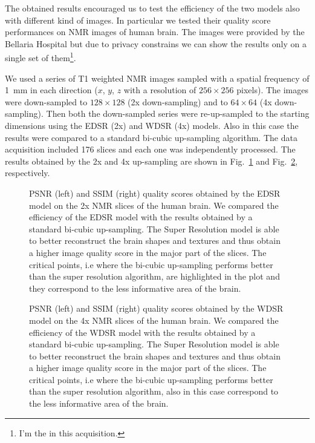\documentclass{standalone}
\begin{document}
The obtained results encouraged us to test the efficiency of the two models also with different kind of images.
In particular we tested their quality score performances on NMR images of human brain.
The images were provided by the Bellaria Hospital but due to privacy constrains we can show the results only on a single set of them\footnote{
  I'm the  in this acquisition.
}.

We used a series of T1 weighted NMR images sampled with a spatial frequency of 1~mm in each direction ($x$, $y$, $z$ with a resolution of $256\times256$ pixels).
The images were down-sampled to $128\times128$ (2x down-sampling) and to $64\times64$ (4x down-sampling).
Then both the down-sampled series were re-up-sampled to the starting dimensions using the EDSR (2x) and WDSR (4x) models.
Also in this case the results were compared to a standard bi-cubic up-sampling algorithm.
The data acquisition included 176 slices and each one was independently processed.
The results obtained by the 2x and 4x up-sampling are shown in Fig.~\ref{fig:sr_2x} and Fig.~\ref{fig:sr_4x}, respectively.

\begin{figure}[htbp]
\centering
\def\svgwidth{\textwidth}

\caption{PSNR (left) and SSIM (right) quality scores obtained by the EDSR model on the 2x NMR slices of the human brain.
We compared the efficiency of the EDSR model with the results obtained by a standard bi-cubic up-sampling.
The Super Resolution model is able to better reconstruct the brain shapes and textures and thus obtain a higher image quality score in the major part of the slices.
The critical points, i.e where the bi-cubic up-sampling performs better than the super resolution algorithm, are highlighted in the plot and they correspond to the less informative area of the brain.
}
\label{fig:sr_2x}
\end{figure}

\begin{figure}[htbp]
\centering
\def\svgwidth{\textwidth}

\caption{PSNR (left) and SSIM (right) quality scores obtained by the WDSR model on the 4x NMR slices of the human brain.
We compared the efficiency of the WDSR model with the results obtained by a standard bi-cubic up-sampling.
The Super Resolution model is able to better reconstruct the brain shapes and textures and thus obtain a higher image quality score in the major part of the slices.
The critical points, i.e where the bi-cubic up-sampling performs better than the super resolution algorithm, also in this case correspond to the less informative area of the brain.
}
\label{fig:sr_4x}
\end{figure}
\end{document}
